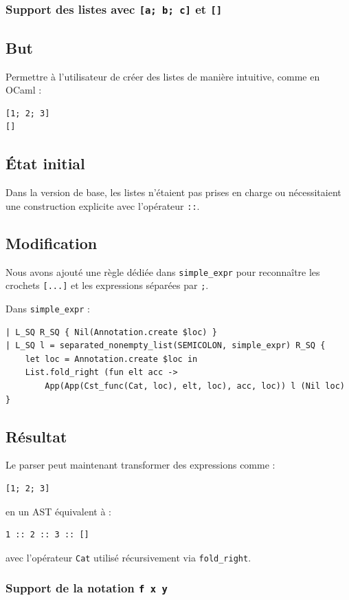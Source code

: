 \subsubsection{Support des listes avec \texttt{[a; b; c]} et \texttt{[]}}

\subsection*{But}
Permettre à l'utilisateur de créer des listes de manière intuitive, comme en OCaml :
\begin{lstlisting}
[1; 2; 3]
[]
\end{lstlisting}

\subsection*{État initial}
Dans la version de base, les listes n’étaient pas prises en charge ou nécessitaient une construction explicite avec l’opérateur \texttt{::}.

\subsection*{Modification}
Nous avons ajouté une règle dédiée dans \texttt{simple\_expr} pour reconnaître les crochets \texttt{[...]} et les expressions séparées par \texttt{;}.

Dans \texttt{simple\_expr} :
\begin{lstlisting}
| L_SQ R_SQ { Nil(Annotation.create $loc) } 
| L_SQ l = separated_nonempty_list(SEMICOLON, simple_expr) R_SQ {
    let loc = Annotation.create $loc in
    List.fold_right (fun elt acc -> 
        App(App(Cst_func(Cat, loc), elt, loc), acc, loc)) l (Nil loc)
}
\end{lstlisting}

\subsection*{Résultat}
Le parser peut maintenant transformer des expressions comme :
\begin{lstlisting}
[1; 2; 3]
\end{lstlisting}
en un AST équivalent à :
\begin{lstlisting}
1 :: 2 :: 3 :: []
\end{lstlisting}
avec l'opérateur \texttt{Cat} utilisé récursivement via \texttt{fold\_right}.

\subsubsection{Support de la notation \texttt{f x y}}

